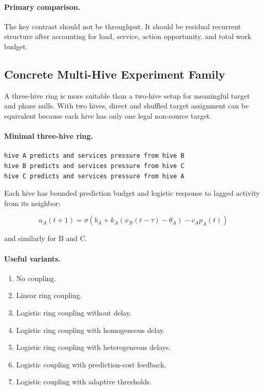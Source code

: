 \documentclass[11pt]{article}
\begin{document}
\paragraph{Primary comparison.}
The key contrast should not be throughput. It should be residual recurrent
structure after accounting for load, service, action opportunity, and total
work budget.

\subsection{Concrete Multi-Hive Experiment Family}

A three-hive ring is more suitable than a two-hive setup for meaningful target
and phase nulls. With two hives, direct and shuffled target assignment can be
equivalent because each hive has only one legal non-source target.

\paragraph{Minimal three-hive ring.}

\begin{verbatim}
hive A predicts and services pressure from hive B
hive B predicts and services pressure from hive C
hive C predicts and services pressure from hive A
\end{verbatim}

Each hive has bounded prediction budget and logistic response to lagged
activity from its neighbor:

\[
a_A(t+1)=\sigma(b_A+k_A(x_B(t-\tau)-\theta_A)-c_Ap_A(t))
\]

and similarly for B and C.

\paragraph{Useful variants.}

\begin{enumerate}
\item No coupling.
\item Linear ring coupling.
\item Logistic ring coupling without delay.
\item Logistic ring coupling with homogeneous delay.
\item Logistic ring coupling with heterogeneous delays.
\item Logistic coupling with prediction-cost feedback.
\item Logistic coupling with adaptive thresholds.
\end{enumerate}
\end{document}
